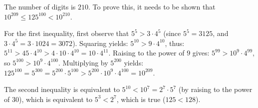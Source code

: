 The number of digits is $210$.
To prove this, it needs to be shown that
$10^{209} \leq 125^{100} < 10^{210}$.

For the first inequality, first observe that $5^5 > 3 \cdot 4^{5}$
(since $5^5 = 3125$, and $3 \cdot 4^{5} = 3 \cdot 1024 = 3072$).
Squaring yields: $5^{10} > 9 \cdot 4^{10}$, thus:
$5^{11}
 > 45 \cdot 4^{10}
 > 4 \cdot 10 \cdot 4^{10}
 = 10 \cdot 4^{11}$.
Raising to the power of $9$ gives:
$5^{99} > 10^9 \cdot 4^{99}$,
so $5^{100} > 10^9 \cdot 4^{100}$.
Multiplying by $5^{200}$ yields:
$125^{100}
 = 5^{300}
 = 5^{200} \cdot 5^{100}
 > 5^{200} \cdot 10^{9} \cdot 4^{100}
 = 10^{209}$.

The second inequality is equivalent to
$5^{10} < 10^{7} = 2^7 \cdot 5^7$
(by raising to the power of $30$),
which is equivalent to $5^3 < 2^7$,
which is true ($125 < 128$).
